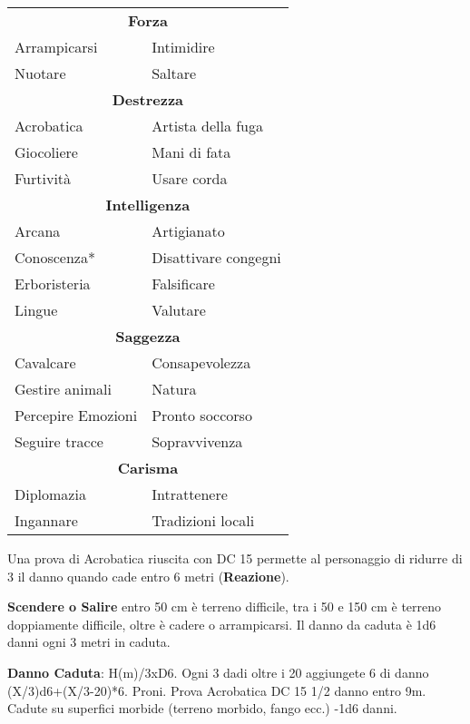 \documentclass[landscape,10pt,a4paper]{article}
\begin{document}
\begin{multicols}{3}
\begin{dmbox}[title=Competenze - pagina \pageref{competenzeelenco}]
\begin{tabularx}{0.95\linewidth}{ll}
\multicolumn{2}{c}{\textbf{Forza}}\\
Arrampicarsi & Intimidire\\
Nuotare& Saltare\\
\multicolumn{2}{c}{\textbf{Destrezza}}\\
Acrobatica & Artista della fuga\\
Giocoliere & Mani di fata\\
Furtività & Usare corda\\
\multicolumn{2}{c}{\textbf{Intelligenza}}\\
Arcana &Artigianato\\
Conoscenza*&Disattivare congegni\\
Erboristeria&Falsificare\\
Lingue&Valutare\\
\multicolumn{2}{c}{\textbf{Saggezza}}\\
Cavalcare &Consapevolezza\\
Gestire animali&Natura\\
Percepire Emozioni&Pronto soccorso\\
Seguire tracce&Sopravvivenza\\
\multicolumn{2}{c}{\textbf{Carisma}}\\
Diplomazia &Intrattenere\\
Ingannare &Tradizioni locali
\end{tabularx}
\end{dmbox}


\begin{dmbox}[title=Acrobatica - pagina \pageref{acrobatica}]
Una prova di Acrobatica riuscita con DC 15 permette al personaggio di ridurre di 3 il danno quando cade entro 6 metri (\textbf{Reazione}).

\textbf{Scendere o Salire} entro 50 cm è terreno difficile, tra i 50 e 150 cm è terreno doppiamente difficile, oltre è cadere o arrampicarsi. Il danno da caduta è 1d6 danni ogni 3 metri in caduta. 

\textbf{Danno Caduta}: H(m)/3xD6. Ogni 3 dadi oltre i 20 aggiungete 6 di danno (X/3)d6+(X/3-20)*6. Proni. Prova Acrobatica DC 15 1/2 danno entro 9m.  Cadute su superfici morbide (terreno morbido, fango ecc.) -1d6 danni.
\end{dmbox}

\begin{dmbox}[title=Arrampicarsi/Scalare - pagina \pageref{arrampicarsi}]


\end{dmbox}
\end{multicols}
\end{document}
